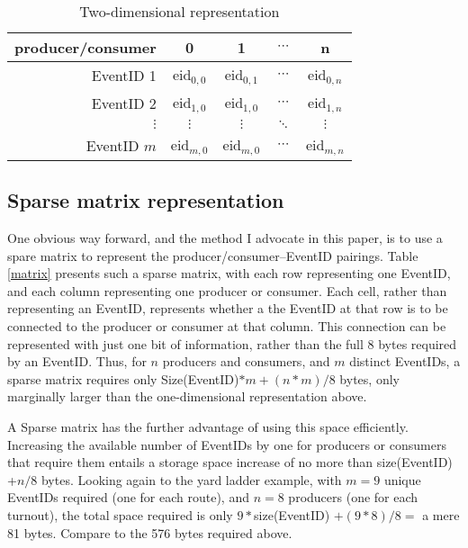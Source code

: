 \documentclass[11pt]{article}
\begin{document}
\begin{table}[htdp]
\caption{Two-dimensional representation}
\begin{center}
\begin{tabular}{r|c|c|c|c|}
producer/consumer&0&1&$\cdots$&n \\ \hline
EventID 1&eid$_{0,0}$ & eid$_{0,1}$ & $\cdots$ &eid$_{0,n}$\\
EventID 2&eid$_{1,0}$ & eid$_{1,0}$ & $\cdots$ &eid$_{1,n}$\\
$\vdots$ & $\vdots$ & $\vdots$ & $\ddots$ & $\vdots$\\
EventID $m$ & eid$_{m,0}$ & eid$_{m,0}$ & $\cdots$ &eid$_{m,n}$\\
\end{tabular}
\end{center}
\label{two-dim}
\end{table}%

\subsection{Sparse matrix representation}

One obvious way forward, and the method I advocate in this paper, is to use a spare matrix to represent the producer/consumer--EventID pairings. Table \ref{matrix} presents such a sparse matrix, with each row representing one EventID, and each column representing one producer or consumer. Each cell, rather than representing an EventID, represents whether a the EventID at that row is to be connected to the producer or consumer at that column. This connection can be represented with just one bit of information, rather than the full 8 bytes required by an EventID. Thus, for $n$ producers and consumers, and $m$ distinct EventIDs, a sparse matrix requires only Size(EventID)$*m + (n*m)/8$ bytes, only marginally larger than the one-dimensional representation above.

A Sparse matrix has the further advantage of using this space efficiently. Increasing the available number of EventIDs by one for producers or consumers that require them entails a storage space increase of no more than size(EventID) +$n/8$ bytes. Looking again to the yard ladder example, with $m=9$ unique EventIDs required (one for each route), and $n=8$ producers (one for each turnout), the total space required is only $9*$size(EventID) $+ (9*8)/8 = $ a mere 81 bytes. Compare to the 576 bytes required above.
\end{document}
